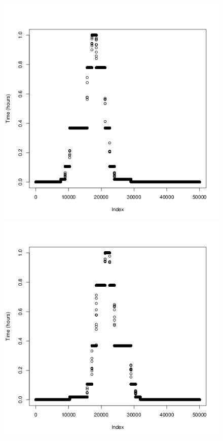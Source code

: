 \documentclass[a4paper, twocolumn]{article}
\begin{document}
\begin{figure}[H]
\begin{minipage}[]{0.2\textwidth}
	    \end{minipage}
	    \begin{minipage}[]{0.2\textwidth}
	    	\includegraphics[width=\textwidth]{share/3_time.png}
	    \end{minipage}
	    \begin{minipage}[]{0.2\textwidth}
	    	\includegraphics[width=\textwidth]{share/4_time.png}

\end{minipage}
\end{figure}
\end{document}
